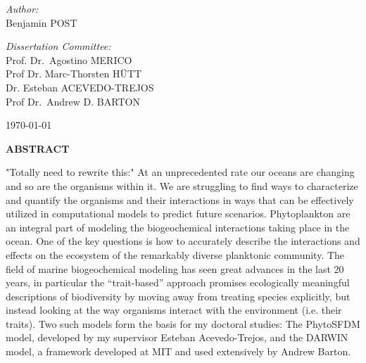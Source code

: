 \begin{titlepage}
\begin{center}
\vspace{3cm}
\begin{minipage}{0.4\textwidth}
\begin{flushleft} 
\emph{Author:}\\
Benjamin \MakeUppercase{Post}
\end{flushleft}
\end{minipage}
\begin{minipage}{0.4\textwidth}
\begin{flushright} 
\emph{Dissertation Committee:} \\
Prof. Dr.~Agostino \MakeUppercase{Merico}\\
Prof Dr. Marc-Thorsten \MakeUppercase{Hütt}\\
Dr. Esteban \MakeUppercase{Acevedo-Trejos}\\
Prof Dr.~Andrew D. \MakeUppercase{Barton}\\
\end{flushright}
\end{minipage}

\vspace{2cm}

{\today}

\end{center}


\large 
\textbf{ABSTRACT} \\

\normalsize

"Totally need to rewrite this:" At an unprecedented rate our oceans are changing and so are the organisms within it. We are struggling to find ways to characterize and quantify the organisms and their interactions in ways that can be effectively utilized in computational models to predict future scenarios. Phytoplankton are an integral part of modeling the biogeochemical interactions taking place in the ocean. One of the key questions is how to accurately describe the interactions and effects on the ecosystem of the remarkably diverse planktonic community. The field of marine biogeochemical modeling has seen great advances in the last 20 years, in particular the “trait-based” approach promises ecologically meaningful descriptions of biodiversity by moving away from treating species explicitly, but instead looking at the way organisms interact with the environment (i.e. their traits). Two such models form the basis for my doctoral studies: The PhytoSFDM model, developed by my supervisor Esteban Acevedo-Trejos, and the DARWIN model, a framework developed at MIT and used extensively by Andrew Barton. 

\end{titlepage}